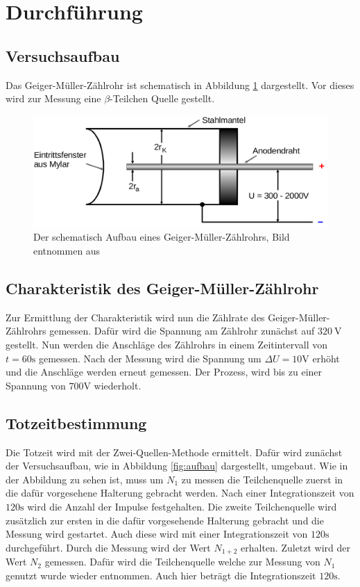 \section{Durchführung}
\label{sec:Durchführung}
\subsection{Versuchsaufbau}
Das Geiger-Müller-Zählrohr ist schematisch in Abbildung \ref{fig:geiger} dargestellt.
Vor dieses wird zur Messung eine $\beta$-Teilchen Quelle gestellt.
\begin{figure}
    \centering
    \includegraphics[width=\textwidth]{content/data/rohre.png}
    \caption{Der schematisch Aufbau eines Geiger-Müller-Zählrohrs, Bild entnommen aus \cite{anleitung}}
    \label{fig:geiger}
\end{figure}

\subsection{Charakteristik des Geiger-Müller-Zählrohr}
\label{subsec:charak}
Zur Ermittlung der Charakteristik wird nun die Zählrate des Geiger-Müller-Zählrohrs gemessen.
Dafür wird die Spannung am Zählrohr zunächst auf $\SI{320}{\V}$ gestellt.
Nun werden die Anschläge des Zählrohrs in einem Zeitintervall von $t=60\si{\second}$ gemessen.
Nach der Messung wird die Spannung um $\Delta U = 10\si{\V}$ erhöht und die Anschläge werden erneut gemessen.
Der Prozess, wird bis zu einer Spannung von $700\si{\V}$ wiederholt.
\FloatBarrier
\subsection{Totzeitbestimmung}
Die Totzeit wird mit der Zwei-Quellen-Methode ermittelt.
Dafür wird zunächst der Versuchsaufbau, wie in Abbildung \ref{fig:aufbau} dargestellt, umgebaut.
Wie in der Abbildung zu sehen ist, muss um $N_1$ zu messen die Teilchenquelle zuerst in die dafür vorgesehene Halterung gebracht werden.
Nach einer Integrationszeit von $120\si{\second}$ wird die Anzahl der Impulse festgehalten.
Die zweite Teilchenquelle wird zusätzlich zur ersten in die dafür vorgesehende Halterung gebracht und die Messung wird gestartet.
Auch diese wird mit einer Integrationszeit von $120 \si{\second}$ durchgeführt.
Durch die Messung wird der Wert $N_{1+2}$ erhalten.
Zuletzt wird der Wert $N_2$ gemessen.
Dafür wird die Teilchenquelle welche zur Messung von $N_1$ genutzt wurde wieder entnommen.
Auch hier beträgt die Integrationszeit $120\si{\second}$.

